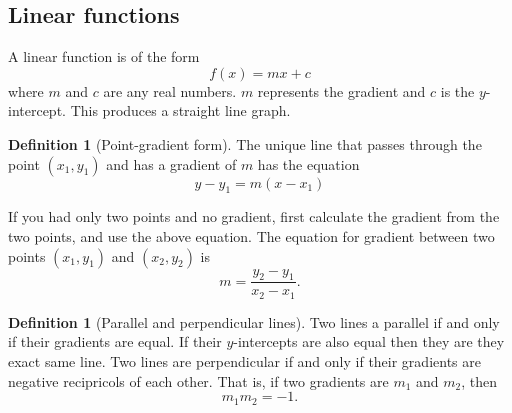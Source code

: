 \documentclass[12pt]{book}
\theoremstyle{definition}
\newtheorem{defi}[theo]{Definition}
\begin{document}
\subsection{Linear functions}
  A linear function is of the form \[f(x)=mx+c\] where $m$ and $c$ are any real numbers. $m$ represents the gradient and
  $c$ is the $y$-intercept. This produces a straight line graph.
  \begin{defi}[Point-gradient form]
    The unique line that passes through the point $(x_1,y_1)$ and has a gradient of $m$ has the equation
    \[y-y_1=m(x-x_1)\] 
  \end{defi}
  If you had only two points and no gradient, first calculate the gradient from the two points, and use the above equation.
  The equation for gradient between two points $(x_1,y_1)$ and $(x_2,y_2)$ is \[m=\frac{y_2-y_1}{x_2-x_1}.\]
  \begin{defi}[Parallel and perpendicular lines]
    Two lines a parallel if and only if their gradients are equal. If their $y$-intercepts are also equal then they are they
    exact same line. Two lines are perpendicular if and only if their gradients are negative recipricols of each other. That
    is, if two gradients are $m_1$ and $m_2$, then \[m_1m_2=-1.\]
  \end{defi}
\end{document}

